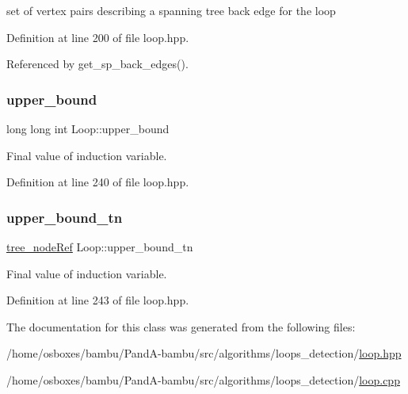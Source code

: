 set of vertex pairs describing a spanning tree back edge for the loop 



Definition at line 200 of file loop.\+hpp.



Referenced by get\+\_\+sp\+\_\+back\+\_\+edges().

\mbox{\label{classLoop_a67fc0cacd5dfe3efec9ca8183834f7fb}} 
\subsubsection{\texorpdfstring{upper\+\_\+bound}{upper\_bound}}
{\footnotesize\ttfamily long long int Loop\+::upper\+\_\+bound}



Final value of induction variable. 



Definition at line 240 of file loop.\+hpp.

\mbox{\label{classLoop_adda920ba0fb698a6ab56fb1d819b699f}} 
\subsubsection{\texorpdfstring{upper\+\_\+bound\+\_\+tn}{upper\_bound\_tn}}
{\footnotesize\ttfamily \hyperlink{tree__node_8hpp_a6ee377554d1c4871ad66a337eaa67fd5}{tree\+\_\+node\+Ref} Loop\+::upper\+\_\+bound\+\_\+tn}



Final value of induction variable. 



Definition at line 243 of file loop.\+hpp.



The documentation for this class was generated from the following files\+:\begin{DoxyCompactItemize}
\item 
/home/osboxes/bambu/\+Pand\+A-\/bambu/src/algorithms/loops\+\_\+detection/\hyperlink{loop_8hpp}{loop.\+hpp}\item 
/home/osboxes/bambu/\+Pand\+A-\/bambu/src/algorithms/loops\+\_\+detection/\hyperlink{loop_8cpp}{loop.\+cpp}\end{DoxyCompactItemize}

